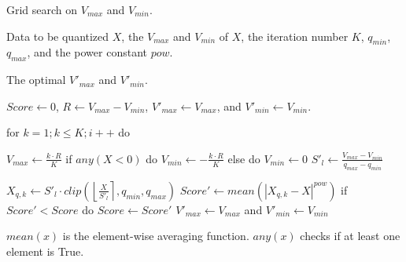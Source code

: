 \begin{algorithm}[t]
	\renewcommand{\algorithmicrequire}{\textbf{Input:}}
	\renewcommand{\algorithmicensure}{\textbf{Output:}}
    \caption{Grid search on $V_{max}$ and $V_{min}$.}
    \label{algo:grid search}
    \begin{algorithmic}[1]
		\REQUIRE Data to be quantized $X$, the $V_{max}$ and $V_{min}$ of $X$, the iteration number $K$, $q_{min}$, $q_{max}$, and the power constant $pow$.
  
		\ENSURE The optimal $V'_{max}$ and $V'_{min}$.

        \STATE $Score\gets 0$, $R\gets V_{max}-V_{min}$, $V'_{max} \gets V_{max}$, and $V'_{min} \gets V_{min}$.

        \STATE for $k=1; k\le K; i++$ do

        \STATE    \quad $V_{max}\gets \frac{k\cdot R}{K} $
        \STATE    \quad if $any(X<0)$ do
        \STATE    \quad \quad $V_{min}\gets -\frac{k\cdot R}{K} $
        \STATE    \quad else do
        \STATE    \quad \quad $V_{min}\gets 0 $
        \STATE  \quad $S'_l\gets\frac{V_{max}-V_{min}}{q_{max}-q_{min}}$ 

        \STATE  \quad $X_{q,k}\gets S'_l\cdot  clip(\left\lfloor\frac{X}{S'_l}\right\rceil,q_{min},q_{max})$
        \STATE  \quad $Score' \gets mean(|X_{q,k}-X|^{pow}) $
        \STATE  \quad if $Score' < Score$ do
        \STATE  \quad \quad $Score\gets Score'$
        \STATE  \quad \quad $V'_{max} \gets V_{max}$ and $V'_{min} \gets V_{min}$
        
    \end{algorithmic}$mean(x)$ is the element-wise averaging function. $any(x)$ checks if at least one element is True.
\end{algorithm}


